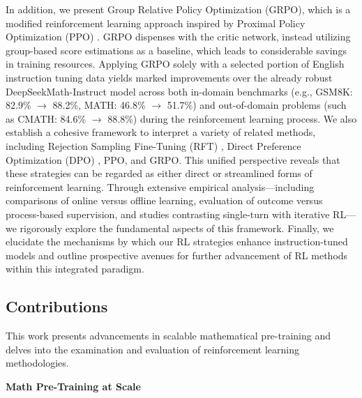 In addition, we present Group Relative Policy Optimization (GRPO), which is a modified reinforcement learning approach inspired by Proximal Policy Optimization (PPO) \citep{schulman2017proximal}. GRPO dispenses with the critic network, instead utilizing group-based score estimations as a baseline, which leads to considerable savings in training resources. Applying GRPO solely with a selected portion of English instruction tuning data yields marked improvements over the already robust DeepSeekMath-Instruct model across both in-domain benchmarks (e.g., GSM8K: 82.9\% $\rightarrow$ 88.2\%, MATH: 46.8\% $\rightarrow$ 51.7\%) and out-of-domain problems (such as CMATH: 84.6\% $\rightarrow$ 88.8\%) during the reinforcement learning process. We also establish a cohesive framework to interpret a variety of related methods, including Rejection Sampling Fine-Tuning (RFT) \citep{yuan2023scaling}, Direct Preference Optimization (DPO) \citep{dpo}, PPO, and GRPO. This unified perspective reveals that these strategies can be regarded as either direct or streamlined forms of reinforcement learning. Through extensive empirical analysis—including comparisons of online versus offline learning, evaluation of outcome versus process-based supervision, and studies contrasting single-turn with iterative RL—we rigorously explore the fundamental aspects of this framework. Finally, we elucidate the mechanisms by which our RL strategies enhance instruction-tuned models and outline prospective avenues for further advancement of RL methods within this integrated paradigm.

\subsection{Contributions}
This work presents advancements in scalable mathematical pre-training and delves into the examination and evaluation of reinforcement learning methodologies.

\textbf{Math Pre-Training at Scale}

